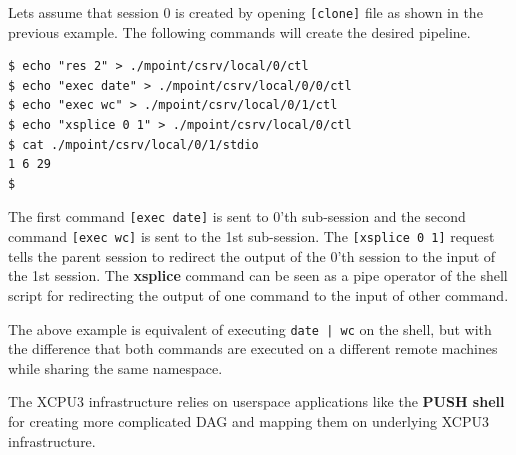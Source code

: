 Lets assume that session 0 is created by opening \texttt{[clone]} file as shown
in the previous example.  The following commands will create the desired
pipeline.

\begin{verbatim}
$ echo "res 2" > ./mpoint/csrv/local/0/ctl
$ echo "exec date" > ./mpoint/csrv/local/0/0/ctl
$ echo "exec wc" > ./mpoint/csrv/local/0/1/ctl
$ echo "xsplice 0 1" > ./mpoint/csrv/local/0/ctl
$ cat ./mpoint/csrv/local/0/1/stdio
1 6 29
$
\end{verbatim}

The first command \texttt{[exec date]} is sent to 0'th sub-session and the
second command \texttt{[exec wc]} is sent to the 1st sub-session.  The
\texttt{[xsplice 0 1]} request tells the parent session to redirect the output
of the 0'th session to the input of the 1st session.  The \textbf{xsplice}
command can be seen as a pipe operator of the shell script for redirecting the
output of one command to the input of other command.

The above example is equivalent of executing \texttt{date | wc} on the shell,
but with the difference that both commands are executed on a different remote
machines while sharing the same namespace.

The XCPU3 infrastructure relies on userspace applications like the \textbf{PUSH
shell}\cite{PODC:Push} for creating more complicated DAG and mapping them on
underlying XCPU3 infrastructure.
